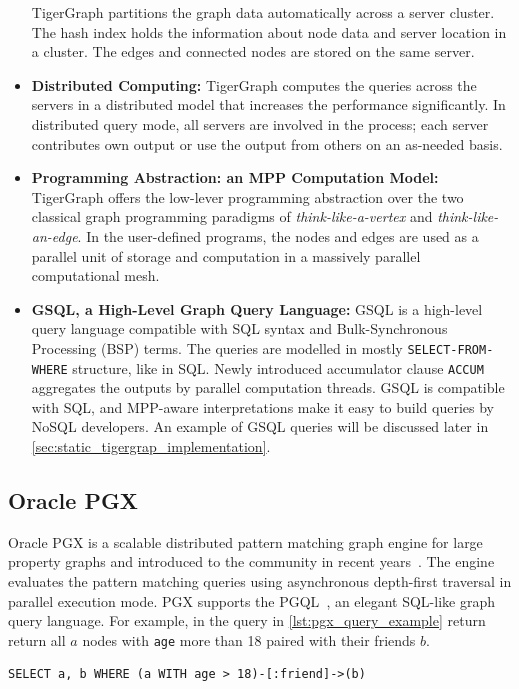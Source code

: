 \begin{itemize}
  TigerGraph partitions the graph data automatically across a server cluster.
  The hash index holds the information about node data and server location in a cluster.
  The edges and connected nodes are stored on the same server.
  \item \textbf{Distributed Computing:}
  TigerGraph computes the queries across the servers in a distributed model that increases the performance significantly.
  In distributed query mode, all servers are involved in the process; each server contributes own output or use the output from others on an as-needed basis.
  \item \textbf{Programming Abstraction: an MPP Computation Model:}
  TigerGraph offers the low-lever programming abstraction over the two classical graph programming paradigms of \textit{think-like-a-vertex} and \textit{think-like-an-edge}.
  In the user-defined programs, the nodes and edges are used as a parallel unit of storage and computation in a massively parallel computational mesh.
  \item \textbf{GSQL, a High-Level Graph Query Language:}
  GSQL is a high-level query language compatible with SQL syntax and Bulk-Synchronous Processing (BSP) terms.
  The queries are modelled in mostly \texttt{SELECT-FROM-WHERE} structure, like in SQL.
  Newly introduced accumulator clause \texttt{ACCUM} aggregates the outputs by parallel computation threads.
  GSQL is compatible with SQL, and MPP-aware interpretations make it easy to build queries by NoSQL developers.
  An example of GSQL queries will be discussed later in \autoref{sec:static_tigergrap_implementation}.
\end{itemize}

\subsection{Oracle PGX}

Oracle PGX is a scalable distributed pattern matching graph engine for large property graphs and introduced to the community in recent years~\cite{pgx_website}.
The engine evaluates the pattern matching queries using asynchronous depth-first traversal in parallel execution mode. 
PGX supports the PGQL~\cite{pgql_website}, an elegant SQL-like graph query language.
For example, in the query in \autoref{lst:pgx_query_example} return return all $a$ nodes with \texttt{age} more than 18 paired with their friends $b$.

\begin{lstlisting}[language=Cypher,frame=single,label={lst:pgx_query_example},caption={Example query in PGX. Based on~\cite{DBLP:conf/grades/RothTHCPMH17}}]
SELECT a, b WHERE (a WITH age > 18)-[:friend]->(b)
\end{lstlisting}

